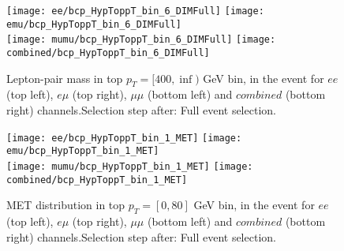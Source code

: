 \documentclass[12pt, a4paper, titlepage]{article}
\begin{document}
\begin{figure}
  \texttt{[image: ee/bcp\_HypToppT\_bin\_6\_DIMFull]}
  \texttt{[image: emu/bcp\_HypToppT\_bin\_6\_DIMFull]}\\
  \texttt{[image: mumu/bcp\_HypToppT\_bin\_6\_DIMFull]}
  \texttt{[image: combined/bcp\_HypToppT\_bin\_6\_DIMFull]}
\caption{Lepton-pair mass in top $p_T = [400,\inf)$ GeV bin, in the event for $ee$ (top left), $e\mu$ (top right), $\mu\mu$ (bottom left) and $combined$ (bottom right) channels.\newline Selection step after: Full event selection.}
\end{figure}

\clearpage
\newpage







% 
% 

\begin{figure}
  \texttt{[image: ee/bcp\_HypToppT\_bin\_1\_MET]}
  \texttt{[image: emu/bcp\_HypToppT\_bin\_1\_MET]}\\
  \texttt{[image: mumu/bcp\_HypToppT\_bin\_1\_MET]}
  \texttt{[image: combined/bcp\_HypToppT\_bin\_1\_MET]}
\caption{MET distribution in top $p_T = [0,80]$ GeV bin, in the event for $ee$ (top left), $e\mu$ (top right), $\mu\mu$ (bottom left) and $combined$ (bottom right) channels.\newline Selection step after: Full event selection.}
\end{figure}
\end{document}
